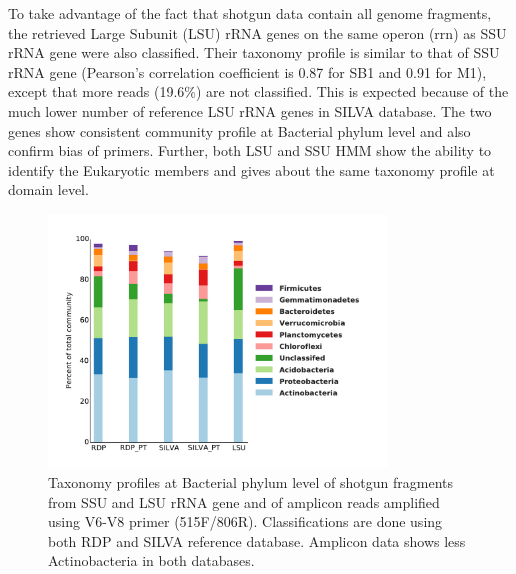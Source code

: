 \documentclass[12pt]{article}
\begin{document}
To take advantage of the fact that shotgun data contain all genome
fragments, the retrieved Large Subunit (LSU) rRNA genes on the same
operon (rrn) as SSU rRNA gene were also classified. Their taxonomy
profile is similar to that of SSU rRNA gene (Pearson’s correlation
coefficient is 0.87 for SB1 and 0.91 for M1), except that more reads
(19.6\%) are not classified. This is expected because of the much
lower number of reference LSU rRNA genes in SILVA database. The two
genes show consistent community profile at Bacterial phylum level and
also confirm bias of primers. Further, both LSU and SSU HMM show the
ability to identify the Eukaryotic members and gives about the same
taxonomy profile at domain level.

\begin{figure}[tbph!]
  \centering
  \includegraphics[width=0.8\textwidth]{figs/V6to8_SB1_taxa}
  \caption[Taxonomy profiles at Bacterial phylum level of shotgun fragments and of amplicon reads amplified using V6-V8 primer]{Taxonomy profiles at Bacterial phylum level of shotgun fragments from SSU and LSU rRNA gene and of amplicon reads amplified using V6-V8 primer (515F/806R). Classifications are done using both RDP and SILVA reference database. Amplicon data shows less Actinobacteria in both databases.}
  \label{fig:V6to8_SB1_taxa}
\end{figure}
\end{document}
